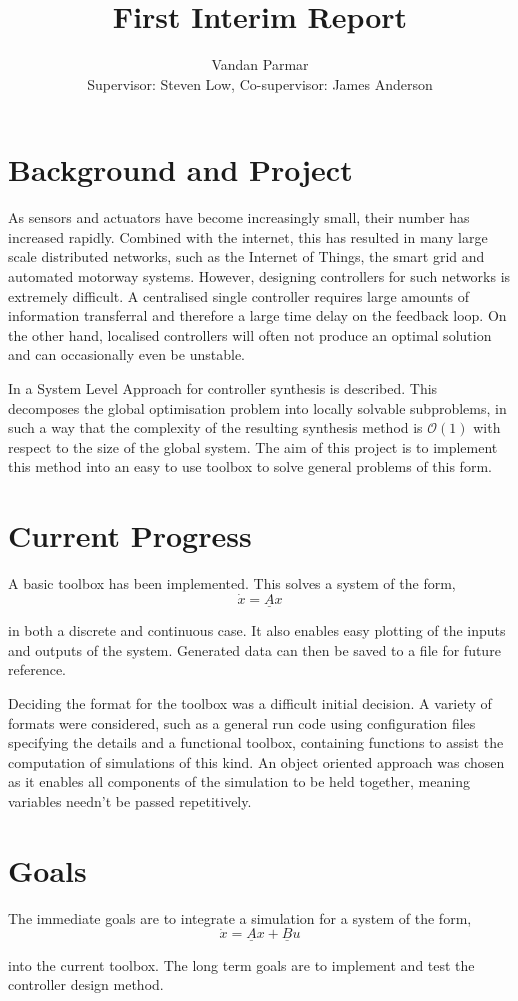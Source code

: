 \documentclass[11pt,a4paper]{article}
\begin{document}
\title{First Interim Report}
\author{Vandan Parmar \\
Supervisor: Steven Low, Co-supervisor: James Anderson}
\maketitle
\section{Background and Project}
As sensors and actuators have become increasingly small, their number has increased rapidly. Combined with the internet, this has resulted in many large scale distributed networks, such as the Internet of Things, the smart grid and automated motorway systems. However, designing controllers for such networks is extremely difficult. A centralised single controller requires large amounts of information transferral and therefore a large time delay on the feedback loop. On the other hand, localised controllers will often not produce an optimal solution and can occasionally even be unstable.

In \cite{Wang2017} a System Level Approach for controller synthesis is described. This decomposes the global optimisation problem into locally solvable subproblems, in such a way that the complexity of the resulting synthesis method is $\mathcal{O}(1)$ with respect to the size of the global system. The aim of this project is to implement this method into an easy to use toolbox to solve general problems of this form.

\section{Current Progress}
A basic toolbox has been implemented. This solves a system of the form, 
$$ \dot{x} = \underline{A}x$$


in both a discrete and continuous case. It also enables easy plotting of the inputs and outputs of the system. Generated data can then be saved to a file for future reference. 

Deciding the format for the toolbox was a difficult initial decision. A variety of formats were considered, such as a general run code using configuration files specifying the details and a functional toolbox, containing functions to assist the computation of simulations of this kind. An object oriented approach was chosen as it enables all components of the simulation to be held together, meaning variables needn’t be passed repetitively.

\section{Goals}
The immediate goals are to integrate a simulation for a system of the form,
$$ \dot{x} = \underline{A}x + \underline{B}u$$

into the current toolbox. The long term goals are to implement and test the controller design method.



\end{document}
